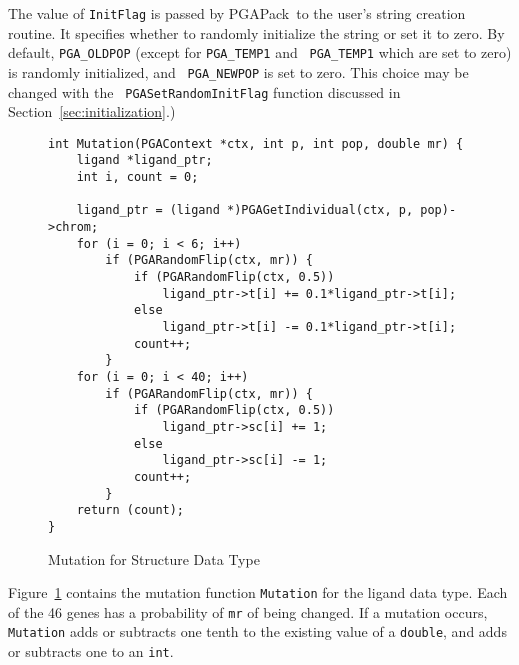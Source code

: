 \documentclass{report}
\newcommand{\pga}{PGAPack}
\begin{document}
The value of {\tt InitFlag} is passed by \pga\ to the user's string creation
routine. It specifies whether to randomly initialize the string or set it to
zero. By default, {\tt PGA\_OLDPOP} (except for {\tt PGA\_TEMP1} and {\tt
PGA\_TEMP1} which are set to zero) is randomly initialized, and {\tt
PGA\_NEWPOP} is set to zero.  This choice may be changed with the {\tt
PGASetRandomInitFlag} function discussed in Section~\ref{sec:initialization}.)


\begin{figure}
\begin{verbatim}
int Mutation(PGAContext *ctx, int p, int pop, double mr) {
    ligand *ligand_ptr;
    int i, count = 0;

    ligand_ptr = (ligand *)PGAGetIndividual(ctx, p, pop)->chrom;
    for (i = 0; i < 6; i++)
        if (PGARandomFlip(ctx, mr)) {
            if (PGARandomFlip(ctx, 0.5))
                ligand_ptr->t[i] += 0.1*ligand_ptr->t[i];
            else
                ligand_ptr->t[i] -= 0.1*ligand_ptr->t[i];
            count++;
        }
    for (i = 0; i < 40; i++)
        if (PGARandomFlip(ctx, mr)) {
            if (PGARandomFlip(ctx, 0.5))
                ligand_ptr->sc[i] += 1;
            else
                ligand_ptr->sc[i] -= 1;
            count++;
        }
    return (count);
}
\end{verbatim}
\caption{Mutation for Structure Data Type}
\label{example1:new-datatype-mutation}
\end{figure}

Figure~\ref{example1:new-datatype-mutation} contains the mutation function
{\tt Mutation} for the ligand data type.  Each of the 46 genes has a
probability of {\tt mr} of being changed.  If a mutation occurs, {\tt
Mutation} adds or subtracts one tenth to the existing value of a {\tt double},
and adds or subtracts one to an {\tt int}.
\end{document}
